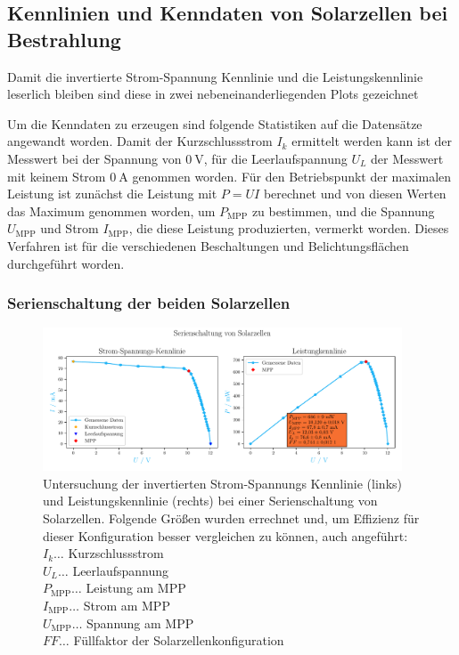 \documentclass[12pt,english,ngerman]{scrartcl}
\begin{document}
\subsection{Kennlinien und Kenndaten von Solarzellen bei Bestrahlung}
Damit die invertierte Strom-Spannung Kennlinie und die Leistungskennlinie
leserlich bleiben sind diese in zwei nebeneinanderliegenden Plots gezeichnet

Um die Kenndaten zu erzeugen sind folgende Statistiken auf die Datensätze
angewandt worden. Damit der Kurzschlussstrom $I_k$ ermittelt werden kann ist
der Messwert bei der Spannung von $\SI{0}{\volt}$, für die Leerlaufspannung
$U_L$ der Messwert mit keinem Strom $\SI{0}{\ampere}$ genommen worden. Für den
Betriebspunkt der maximalen Leistung ist zunächst die Leistung mit $P=UI$
berechnet und von diesen Werten das Maximum genommen worden, um $P_\text{MPP}$
zu bestimmen, und die Spannung $U_\text{MPP}$ und Strom $I_\text{MPP}$, die
diese Leistung produzierten, vermerkt worden. Dieses Verfahren ist für die
verschiedenen Beschaltungen und Belichtungsflächen durchgeführt worden.

\subsubsection{Serienschaltung der beiden Solarzellen}
\begin{figure}[H]
	\centering
	\includegraphics[width=0.95\textwidth]{figures/serienschaltung.pdf}
	\caption[Kennlinien Serienschaltung Solarzellen]{Untersuchung der invertierten
		Strom-Spannungs Kennlinie (links) und Leistungskennlinie (rechts) bei einer
		Serienschaltung von Solarzellen. Folgende Größen wurden errechnet und, um
		Effizienz für dieser Konfiguration besser vergleichen zu können, auch
		angeführt:                           \\
		$I_k \dots$ Kurzschlussstrom         \\
		$U_L \dots$ Leerlaufspannung         \\
		$P_\text{MPP} \dots$ Leistung am MPP \\
		$I_\text{MPP} \dots$ Strom am MPP    \\
		$U_\text{MPP} \dots$ Spannung am MPP \\
		$FF \dots$ Füllfaktor der Solarzellenkonfiguration
	}\label{fig:auws_kennlinie_serie}
\end{figure}
\end{document}
